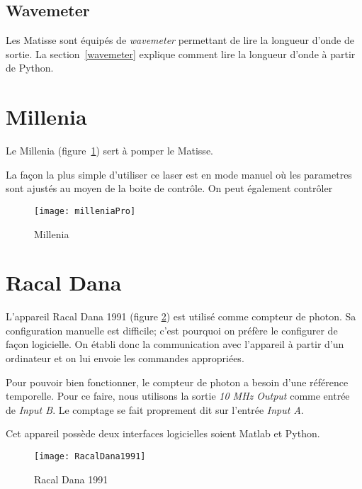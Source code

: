 \documentclass[11pt,francais]{book} %
\begin{document}
\subsection{Wavemeter}

Les Matisse sont équipés de {\it wavemeter} permettant de lire la longueur d'onde de sortie.
La section~\ref{wavemeter} explique comment lire la longueur d'onde à partir de Python.


\section{Millenia}

Le Millenia (figure~\ref{fig:millenia}) sert à pomper le Matisse.

La fa\c{c}on la plus simple d'utiliser ce laser est en mode manuel où les parametres sont ajustés au moyen de la boite de contrôle.
On peut également contrôler 

\begin{figure}[htbp]
\centering\texttt{[image: milleniaPro]}
\caption{Millenia}
\label{fig:millenia}
\end{figure}


\section{Racal Dana}

L'appareil Racal Dana 1991 (figure \ref{fig:racaldana}) est utilisé comme compteur de photon.
Sa configuration manuelle est difficile; c'est pourquoi on préfère le configurer de fa\c{c}on logicielle.
On établi donc la communication avec l'appareil à partir d'un ordinateur et on lui envoie les commandes appropriées.

Pour pouvoir bien fonctionner, le compteur de photon a besoin d'une référence temporelle.
Pour ce faire, nous utilisons la sortie {\it 10 MHz Output} comme entrée de {\it Input B}.
Le comptage se fait proprement dit sur l'entrée {\it Input A}.

Cet appareil possède deux interfaces logicielles soient Matlab et Python.

\begin{figure}[htbp]
\centering\texttt{[image: RacalDana1991]}
\caption{Racal Dana 1991}
\label{fig:racaldana}
\end{figure}
\end{document}
